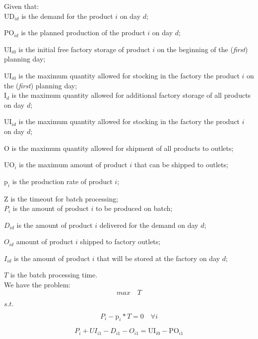 \documentclass[authoryear,preprint,12pt]{elsarticle}
\begin{document}
Given that: \\

$\textrm{UD}_{id}$ is the demand for the product $i$ on day $d$;

$\textrm{PO}_{id}$ is the planned production of the product $i$ on day $d$;

$\textrm{UI}_{i0}$ is the initial free factory storage of product $i$ on the beginning of the (\emph{first}) planning day; 


$\textrm{UI}_{i0}$ is the maximum quantity allowed for stocking in the factory the product $i$ on the (\emph{first}) planning day; \\


$\textrm{I}_{d}$ is the maximum quantity allowed for additional factory storage of all products on day $d$;

$\textrm{UI}_{id}$ is the maximum quantity allowed for stocking in the factory the product $i$ on day $d$;

$\textrm{O}$ is the maximum quantity allowed for shipment of all products to outlets;

$\textrm{UO}_i$ is the maximum amount of product $i$ that can be shipped to outlets;

$\textrm{p}_i$ is the production rate of product $i$;

$\textrm{Z}$ is the timeout for batch processing; \\

$P_i$ is the amount of product $i$ to be produced on batch;

$D_{id}$ is the amount of product $i$ delivered for the demand on day $d$;

$O_{id}$ amount of product $i$ shipped to factory outlets;

$I_{id}$ is the amount of product $i$ that will be stored at the factory on day $d$;

$T$ is the batch processing time. \\

We have the problem: \\

\begin{equation}
max \quad T
\end{equation}

$s.t.$

\begin{equation}
P_i - \textrm{p}_i * T  = 0 \quad \forall i
\end{equation}

\begin{equation}
P_i + UI_{i1} - D_{i1} - O_{i1} = \textrm{UI}_{i0} - \textrm{PO}_{i1}
\end{equation}
\end{document}
